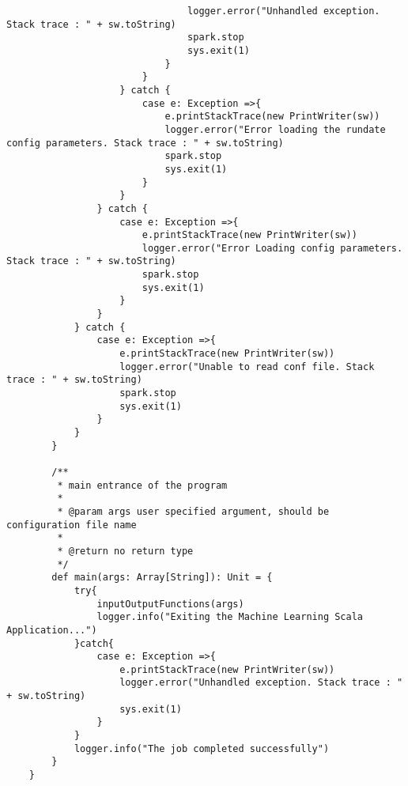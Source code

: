 \documentclass[12pt]{article}
\begin{document}
\begin{lstlisting}
       							logger.error("Unhandled exception. Stack trace : " + sw.toString)
       							spark.stop
       							sys.exit(1)
       						}
       					}
       				} catch {
       					case e: Exception =>{
       						e.printStackTrace(new PrintWriter(sw))
       						logger.error("Error loading the rundate config parameters. Stack trace : " + sw.toString)
       						spark.stop
       						sys.exit(1)					
       					}
       				}
       			} catch {
       				case e: Exception =>{
       					e.printStackTrace(new PrintWriter(sw))
       					logger.error("Error Loading config parameters. Stack trace : " + sw.toString)
       					spark.stop
       					sys.exit(1)				
       				}
       			}
       		} catch {
       			case e: Exception =>{
       				e.printStackTrace(new PrintWriter(sw))
       				logger.error("Unable to read conf file. Stack trace : " + sw.toString)
       				spark.stop
       				sys.exit(1)
       			}
       		}		
       	}
    
       	/**
      	 * main entrance of the program
      	 * 
      	 * @param args user specified argument, should be configuration file name
      	 * 
      	 * @return no return type
      	 */
       	def main(args: Array[String]): Unit = {
       		try{
       			inputOutputFunctions(args)
       			logger.info("Exiting the Machine Learning Scala Application...")
       		}catch{
       			case e: Exception =>{
       				e.printStackTrace(new PrintWriter(sw))
       				logger.error("Unhandled exception. Stack trace : " + sw.toString)
       				sys.exit(1)
       			}
       		}
       		logger.info("The job completed successfully")
       	}
    }
	\end{lstlisting}

	
\end{document}

